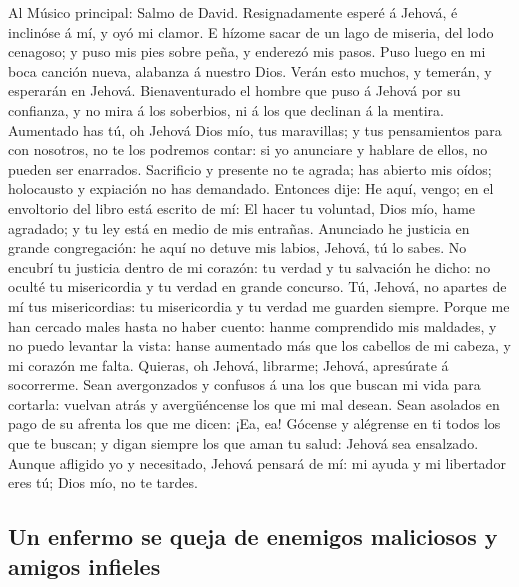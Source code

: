  Al Músico principal: Salmo de David. Resignadamente
esperé á Jehová, é inclinóse á mí, y oyó mi clamor.  E
hízome sacar de un lago de miseria, del lodo cenagoso; y puso mis pies
sobre peña, y enderezó mis pasos.  Puso luego en mi boca
canción nueva, alabanza á nuestro Dios. Verán esto muchos, y temerán, y
esperarán en Jehová.  Bienaventurado el hombre que puso á
Jehová por su confianza, y no mira á los soberbios, ni á los que
declinan á la mentira.  Aumentado has tú, oh Jehová Dios
mío, tus maravillas; y tus pensamientos para con nosotros, no te los
podremos contar: si yo anunciare y hablare de ellos, no pueden ser
enarrados.  Sacrificio y presente no te agrada; has
abierto mis oídos; holocausto y expiación no has demandado.
 Entonces dije: He aquí, vengo; en el envoltorio del libro
está escrito de mí:  El hacer tu voluntad, Dios mío, hame
agradado; y tu ley está en medio de mis entrañas. 
Anunciado he justicia en grande congregación: he aquí no detuve mis
labios, Jehová, tú lo sabes.  No encubrí tu justicia
dentro de mi corazón: tu verdad y tu salvación he dicho: no oculté tu
misericordia y tu verdad en grande concurso.  Tú, Jehová,
no apartes de mí tus misericordias: tu misericordia y tu verdad me
guarden siempre.  Porque me han cercado males hasta no
haber cuento: hanme comprendido mis maldades, y no puedo levantar la
vista: hanse aumentado más que los cabellos de mi cabeza, y mi corazón
me falta.  Quieras, oh Jehová, librarme; Jehová,
apresúrate á socorrerme.  Sean avergonzados y confusos á
una los que buscan mi vida para cortarla: vuelvan atrás y avergüéncense
los que mi mal desean.  Sean asolados en pago de su
afrenta los que me dicen: ¡Ea, ea!  Gócense y alégrense
en ti todos los que te buscan; y digan siempre los que aman tu salud:
Jehová sea ensalzado.  Aunque afligido yo y necesitado,
Jehová pensará de mí: mi ayuda y mi libertador eres tú; Dios mío, no te
tardes.

\hypertarget{un-enfermo-se-queja-de-enemigos-maliciosos-y-amigos-infieles}{%
\subsection{Un enfermo se queja de enemigos maliciosos y amigos
infieles}\label{un-enfermo-se-queja-de-enemigos-maliciosos-y-amigos-infieles}}

